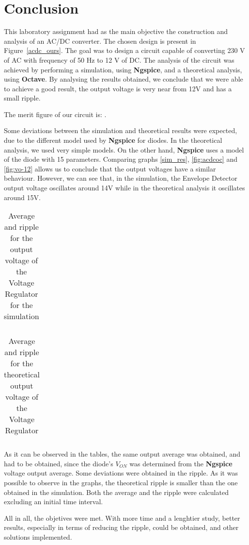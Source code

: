 \section{Conclusion}
\label{sec:conclusion}

This laboratory assignment had as the main objective the construction and analysis of an AC/DC converter. The chosen design is present in Figure~\ref{acdc_ours}. The goal was to design a circuit capable of converting 230 V of AC with frequency of 50 Hz to 12 V of DC. The analysis of the circuit was achieved by performing a simulation, using {\bf Ngspice}, and a theoretical analysis, using {\bf Octave}. By analysing the results obtained, we conclude that we were able to achieve a good result, the output voltage is very near from 12V and has a small ripple. 

The merit figure of our circuit is: .

Some deviations between the simulation and theoretical results were expected, due to the different model used by {\bf Ngspice} for diodes. In the theoretical analysis, we used very simple models. On the other hand, {\bf Ngspice} uses a model of the diode with 15 parameters. Comparing graphs \ref{sim_res}, \ref{fig:acdcoc} and \ref{fig:vo-12} allows us to conclude that the output voltages have a similar behaviour. However, we can see that, in the simulation, the Envelope Detector output voltage oscillates around 14V while in the theoretical analysis it oscillates around 15V. 

\begin{table}[H]
  \centering
  \begin{tabular}{|c|c|}
    \hline
        
        \hline
  \end{tabular}
  \caption{Average and ripple for the output voltage of the Voltage Regulator for the simulation}
  \label{tab:acdcsim}
\end{table}

\begin{table}[H]
  \centering
  \begin{tabular}{|c|c|}
    \hline
        
        \hline
  \end{tabular}
  \caption{Average and ripple for the theoretical output voltage of the Voltage Regulator}
  \label{tab:acdcoc}
\end{table}

As it can be observed in the tables, the same output average was obtained, and had to be obtained, since the diode's $V_{ON}$ was determined from the {\bf Ngspice} voltage output average. Some deviations were obtained in the ripple. As it was possible to observe in the graphs, the theoretical ripple is smaller than the one obtained in the simulation. Both the average and the ripple were calculated excluding an initial time interval.

All in all, the objetives were met. With more time and a lenghtier study, better results, especially in terms of reducing the ripple, could be obtained, and other solutions implemented.
